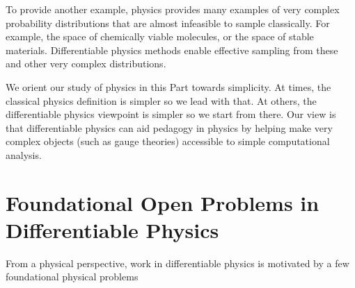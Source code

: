 \documentclass[book.tex]{subfiles}
\begin{document}
To provide another example, physics provides many examples of very complex probability distributions that are almost infeasible to sample classically. For example, the space of chemically viable molecules, or the space of stable materials. Differentiable physics methods enable effective sampling from these and other very complex distributions. 

We orient our study of physics in this Part towards simplicity. At times, the classical physics definition is simpler so we lead with that. At others, the differentiable physics viewpoint is simpler so we start from there. Our view is that differentiable physics can aid pedagogy in physics by helping make very complex objects (such as gauge theories) accessible to simple computational analysis.


\section{Foundational Open Problems in Differentiable Physics}

From a physical perspective, work in differentiable physics is motivated by a few foundational physical problems
\end{document}
